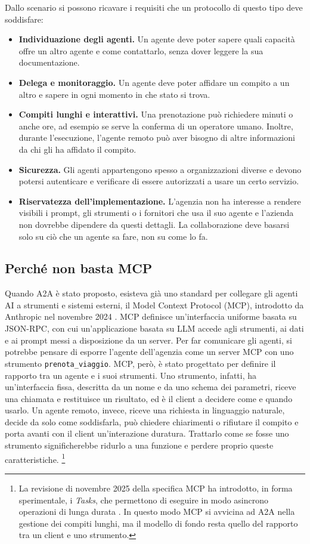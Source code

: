 Dallo scenario si possono ricavare i requisiti che un protocollo di questo tipo deve soddisfare:

\begin{itemize}
    \item \textbf{Individuazione degli agenti.} Un agente deve poter sapere quali capacità offre un altro agente e come contattarlo, senza dover leggere la sua documentazione.
    \item \textbf{Delega e monitoraggio.} Un agente deve poter affidare un compito a un altro e sapere in ogni momento in che stato si trova.
    \item \textbf{Compiti lunghi e interattivi.} Una prenotazione può richiedere minuti o anche ore, ad esempio se serve la conferma di un operatore umano. Inoltre, durante l'esecuzione, l'agente remoto può aver bisogno di altre informazioni da chi gli ha affidato il compito.
    \item \textbf{Sicurezza.} Gli agenti appartengono spesso a organizzazioni diverse e devono potersi autenticare e verificare di essere autorizzati a usare un certo servizio.
    \item \textbf{Riservatezza dell'implementazione.} L'agenzia non ha interesse a rendere visibili i prompt, gli strumenti o i fornitori che usa il suo agente e l'azienda non dovrebbe dipendere da questi dettagli. La collaborazione deve basarsi solo su ciò che un agente sa fare, non su come lo fa.
\end{itemize}

\subsection{Perché non basta MCP}

Quando A2A è stato proposto, esisteva già uno standard per collegare gli agenti AI a strumenti e sistemi esterni, il Model Context Protocol (MCP), 
introdotto da Anthropic nel novembre 2024 \cite{anthropic2024mcp}. MCP definisce un'interfaccia uniforme basata su JSON-RPC, con cui un'applicazione basata 
su LLM accede agli strumenti, ai dati e ai prompt messi a disposizione da un server.
Per far comunicare gli agenti, si potrebbe pensare di esporre l'agente dell'agenzia come un server MCP con uno strumento \texttt{prenota\_\allowbreak viaggio}. 
MCP, però, è stato progettato per definire il rapporto tra un agente e i suoi strumenti. Uno strumento, infatti, ha un'interfaccia fissa, descritta da un nome 
e da uno schema dei parametri, riceve una chiamata e restituisce un risultato, ed è il client a decidere come e quando usarlo. Un agente remoto, invece, 
riceve una richiesta in linguaggio naturale, decide da solo come soddisfarla, può chiedere chiarimenti o rifiutare il compito e porta avanti con il client
 un'interazione duratura. Trattarlo come se fosse uno strumento significherebbe ridurlo a una funzione e perdere proprio queste caratteristiche.%
\footnote{La revisione di novembre 2025 della specifica MCP ha introdotto, in forma sperimentale, 
   i \emph{Tasks}, che permettono di eseguire in modo asincrono operazioni di lunga durata \cite{mcp2025spec}. In questo modo MCP si avvicina ad A2A nella gestione dei compiti lunghi, ma il modello di fondo resta quello del rapporto tra un client e uno strumento.}

